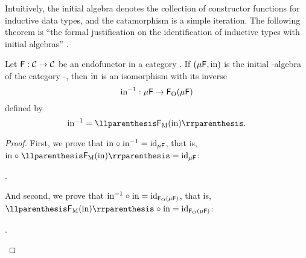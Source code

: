 Intuitively, the initial algebra denotes the collection of constructor
functions for inductive data types, and the catamorphism is a simple
iteration. The following theorem is ``the formal justification on the
identification of inductive types with initial algebras''
\parencite[17]{vene-2000}.

\begin{theorem}%
  \label{the:lambek}


  Let $\mathsf{F}: \mathcal{C} \to \mathcal{C}$ be an endofunctor in a category
  . If $(\mu\mathsf{F},\operatorname{in})$ is the initial -algebra of
  the category -\alg, then $\operatorname{in}$ is an isomorphism with its
  inverse
  \begin{equation*}
    \operatorname{in}^{-1}: \mu\mathsf{F} \to \mathsf{F}_{\operatorname{O}}(\mu\mathsf{F})
  \end{equation*}
  defined by
  \begin{equation}
    \inmo^{-1} = \cata{\funcM{F}(\inmo)}
    \text{.}
  \end{equation}

  \begin{proof}

    First, we prove that $\operatorname{in} \mathrel{\circ} \operatorname{in}^{-1} = \operatorname{id}_{\mu\mathsf{F}}$,
    that is, $\inmo \comp \cata{\funcM{F}(\inmo)} =
    \idO{\mu\func{F}}$:
    \begin{steps}
      \stepm{\cata\inmo}
        \eqby{\eqref{eq:cata-refl}}
      .
    \end{steps}
    And second, we prove that $\operatorname{in}^{-1} \mathrel{\circ} \operatorname{in} =
    \operatorname{id}_{\mathsf{F}_{\operatorname{O}}(\mu\mathsf{F})}$, that is, $\cata{\funcM{F}(\inmo)}
    \comp \inmo = \idO{\funcO{F}(\mu\func{F})}$:
    \begin{steps}
      .
    \end{steps}

  \end{proof}

\end{theorem}

